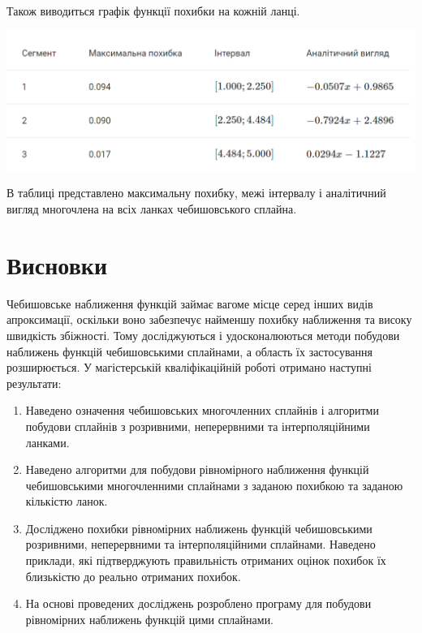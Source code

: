 \documentclass[ukrainian,14pt]{extarticle}
\begin{document}
Також виводиться графік функції похибки на кожній ланці.

\includegraphics[scale=0.5]{program_screenshots/example_table_result.png}

В таблиці представлено максимальну похибку, межі інтервалу і аналітичний вигляд многочлена на всіх ланках чебишовського сплайна. 


\newpage

\section*{Висновки}

Чебишовське наближення функцій займає вагоме місце серед інших видів
апроксимації, оскільки воно забезпечує найменшу похибку наближення та
високу швидкість збіжності. Тому досліджуються і удосконалюються методи
побудови наближень функцій чебишовськими сплайнами, а область їх
застосування розширюється. У магістерській кваліфікаційній роботі отримано
наступні результати:

\begin{enumerate}
    \item Наведено означення чебишовських многочленних сплайнів і алгоритми
побудови сплайнів з розривними, неперервними та інтерполяційними ланками.
    \item Наведено алгоритми для побудови рівномірного наближення функцій
чебишовськими многочленними сплайнами з заданою похибкою та заданою
кількістю ланок.
    \item Досліджено похибки рівномірних наближень функцій чебишовськими
розривними, неперервними та інтерполяційними сплайнами. Наведено
приклади, які підтверджують правильність отриманих оцінок похибок їх
близькістю до реально отриманих похибок.
    \item На основі проведених досліджень розроблено програму для побудови
рівномірних наближень функцій цими сплайнами.
\end{enumerate}
\end{document}
